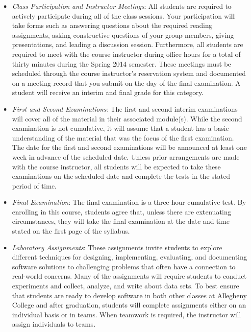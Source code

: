 \begin{itemize}

	\item {\em Class Participation and Instructor Meetings}: All students are required to actively participate
	  during all of the class sessions. Your participation will take forms such as answering questions about the
	  required reading assignments, asking constructive questions of your group members, giving presentations, and
	  leading a discussion session. Furthermore, all students are required to meet with the course instructor during
	  office hours for a total of thirty minutes during the Spring 2014 semester.  These meetings must be scheduled
	  through the course instructor's reservation system and documented on a meeting record that you submit on the
	  day of the final examination. A student will receive an interim and final grade for this category.

	\item {\em First and Second Examinations}: The first and second interim examinations will cover all of the material
	  in their associated module(s).  While the second examination is not cumulative, it will assume that a student has a
	  basic understanding of the material that was the focus of the first examination.  The date for the first and
	  second examinations will be announced at least one week in advance of the scheduled date.  Unless prior
	  arrangements are made with the course instructor, all students will be expected to take these examinations on the
	  scheduled date and complete the tests in the stated period of time.

	\item {\em Final Examination}: The final examination is a three-hour cumulative test.  By enrolling in this
	  course, students agree that, unless there are extenuating circumstances, they will take the final examination
	  at the date and time stated on the first page of the syllabus.

	\item {\em Laboratory Assignments}: These assignments invite students to explore different techniques for
	  designing, implementing, evaluating, and documenting software solutions to challenging problems that often
	  have a connection to real-world concerns.  Many of the assignments will require students to conduct
	  experiments and collect, analyze, and write about data sets.  To best ensure that students are ready to
	  develop software in both other classes at Allegheny College and after graduation, students will complete
	  assignments either on an individual basis or in teams.  When teamwork is required, the instructor will assign
	  individuals to teams.
	

\end{itemize}
